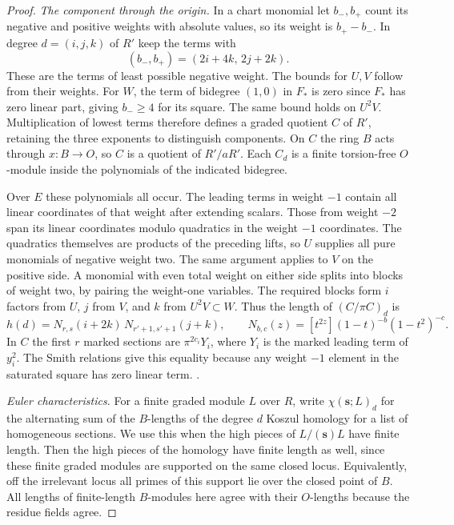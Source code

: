 \begin{proof}
\emph{The component through the origin.}
In a chart monomial let \(b_-,b_+\) count its negative and
positive weights with absolute values, so its weight is \(b_+-b_-\).
In degree \(d=(i,j,k)\) of \(R'\) keep the terms with
\[
 (b_-,b_+)=(2i+4k,\,2j+2k).
\]
These are the terms of least possible negative weight. The bounds
for \(U,V\) follow from their weights. For \(W\), the term of
bidegree \((1,0)\) in \(F_*\) is zero since \(F_*\) has zero linear
part, giving \(b_-\ge4\) for its square. The same bound holds on
\(U^2V\). Multiplication of lowest terms therefore defines a
graded quotient \(C\) of \(R'\), retaining the three exponents to
distinguish components. On \(C\) the ring \(B\) acts through
\(x:B\to O\), so \(C\) is a quotient of \(R'/aR'\).
Each \(C_d\) is a finite torsion-free \(O\)-module inside the
polynomials of the indicated bidegree.

Over \(E\) these polynomials all occur. The leading terms in
weight \(-1\) contain all linear coordinates of that weight after
extending scalars. Those from weight \(-2\) span its linear
coordinates modulo quadratics in the weight \(-1\) coordinates.
The quadratics themselves are products of the preceding lifts,
so \(U\) supplies all pure monomials of negative weight two. The
same argument applies to \(V\) on the positive side. A monomial
with even total weight on either side splits into blocks of weight
two, by pairing the weight-one variables. The required blocks form
\(i\) factors from \(U\), \(j\) from \(V\), and \(k\) from
\(U^2V\subset W\). Thus the length of \((C/\pi C)_d\) is
\[
 h(d)=N_{r,s}(i+2k)\,N_{r'+1,s'+1}(j+k),\qquad
 N_{b,c}(z)=[t^{2z}](1-t)^{-b}(1-t^2)^{-c}.
\]
In \(C\) the first \(r\) marked sections are
\(\pi^{2c_i}Y_i\), where \(Y_i\) is the marked leading term of
\(y_i^2\). The Smith relations give this equality because any
weight \(-1\) element in the saturated square has zero linear term.
.

\emph{Euler characteristics.}
For a finite graded module \(L\) over \(R\), write
\(\chi(\mathbf{s};L)_d\) for the alternating sum of the \(B\)-lengths
of the degree \(d\) Koszul homology for a list of homogeneous
sections. We use this when the high pieces of \(L/(\mathbf{s})L\)
have finite length. Then the high pieces of the homology have finite
length as well, since these finite graded modules are supported on
the same closed locus. Equivalently, off the irrelevant locus all
primes of this support lie over the closed point of \(B\). All
lengths of finite-length \(B\)-modules here agree with their
\(O\)-lengths because the residue fields agree.


\end{proof}
